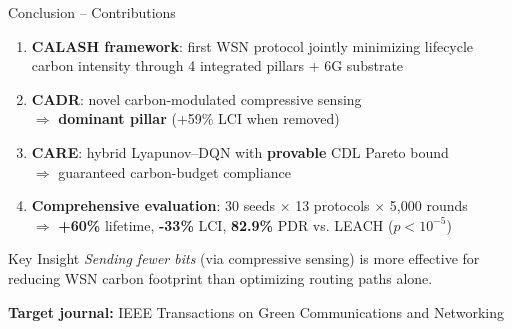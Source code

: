 \documentclass[aspectratio=169, 11pt]{beamer}
\begin{document}
\begin{frame}{Conclusion -- Contributions}
\begin{enumerate}
    \item[\textbf{C1}] \textbf{CALASH framework}: first WSN protocol jointly minimizing lifecycle carbon intensity through 4 integrated pillars + 6G substrate

    \item[\textbf{C2}] \textbf{CADR}: novel carbon-modulated compressive sensing\\$\Rightarrow$ \textbf{dominant pillar} (+59\% LCI when removed)

    \item[\textbf{C3}] \textbf{CARE}: hybrid Lyapunov--DQN with \textbf{provable} CDL Pareto bound\\$\Rightarrow$ guaranteed carbon-budget compliance

    \item[\textbf{C4}] \textbf{Comprehensive evaluation}: 30 seeds $\times$ 13 protocols $\times$ 5,000 rounds\\$\Rightarrow$ \textbf{+60\%} lifetime, \textbf{-33\%} LCI, \textbf{82.9\%} PDR vs. LEACH ($p < 10^{-5}$)
\end{enumerate}

\vspace{4mm}
\begin{block}{Key Insight}
\centering
\textit{Sending fewer bits} (via compressive sensing) is more effective for reducing WSN carbon footprint than optimizing routing paths alone.
\end{block}

\vspace{2mm}
\centering
\textbf{Target journal:} IEEE Transactions on Green Communications and Networking
\end{frame}
\end{document}
